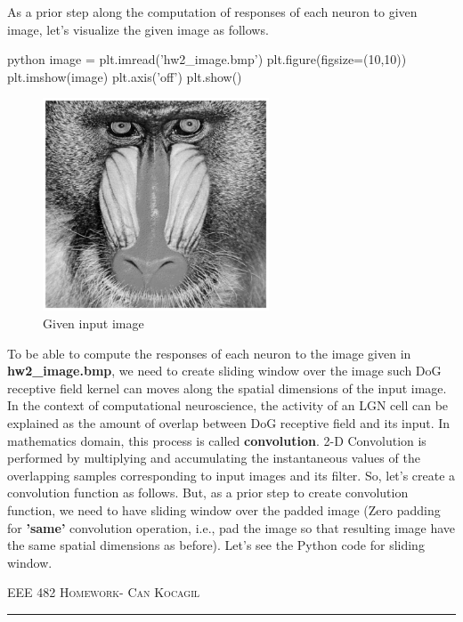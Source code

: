 \documentclass[12pt]{amsart}
\begin{document}
\bigskip

As a prior step along the computation of responses of each neuron to given image, let's visualize the given image as follows.


\begin{mintedbox}{python}
image = plt.imread('hw2_image.bmp')
plt.figure(figsize=(10,10))
plt.imshow(image)
plt.axis('off')
plt.show()
\end{mintedbox}

\begin{figure}[h]
    \centering
    \includegraphics[width = 0.6\textwidth]{images/image.png}
    \caption{Given input image}
\end{figure}

To be able to compute the responses of each neuron to the image given in \textbf{hw2\_image.bmp}, we need to create sliding window over the image such DoG receptive field kernel can moves along the spatial dimensions of the input image. In the context of computational neuroscience, the activity of an LGN cell can be explained as the amount of overlap between DoG receptive field and its input. In mathematics domain, this process is called \textbf{convolution}. 2-D  Convolution is performed by multiplying and accumulating the instantaneous values of the overlapping samples corresponding to input images and its filter. So, let's create a convolution function as follows. But, as a prior step to create convolution function, we need to have sliding window over the padded image (Zero padding for \textbf{'same'} convolution operation, i.e., pad the image so that resulting image have the same spatial dimensions as before). Let's see the Python code for sliding window.

\newpage
{\scshape EEE 482} \hfill {\scshape \large  Homework-\relax} \hfill {\scshape Can Kocagil}
\smallskip
\hrule
\vspace{2mm}
\end{document}
